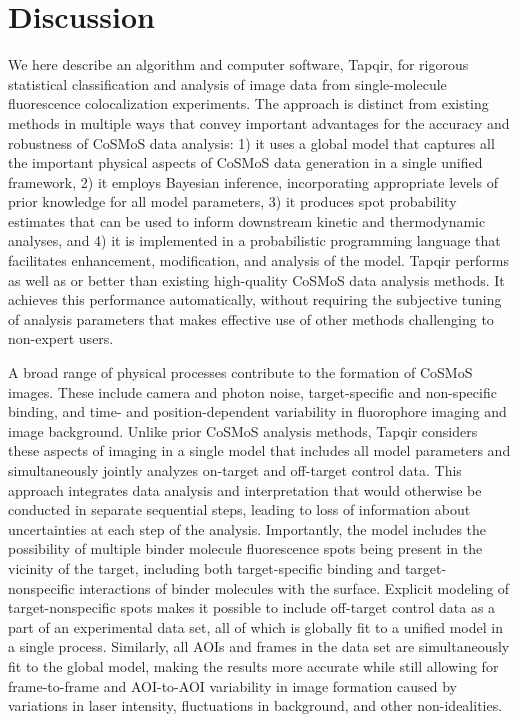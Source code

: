 \section*{Discussion}

We here describe an algorithm and computer software, Tapqir, for rigorous statistical classification and analysis of image data from single-molecule fluorescence colocalization experiments. The approach is distinct from existing methods in multiple ways that convey important advantages for the accuracy and robustness of CoSMoS data analysis: 1) it uses a global model that captures all the important physical aspects of CoSMoS data generation in a single unified framework, 2) it employs Bayesian inference, incorporating appropriate levels of prior knowledge for all model parameters, 3) it produces spot probability estimates that can be used to inform downstream kinetic and thermodynamic analyses, and 4) it is implemented in a probabilistic programming language that facilitates enhancement, modification, and analysis of the model. Tapqir performs as well as or better than  existing high-quality CoSMoS data analysis methods. It achieves this performance automatically, without requiring the subjective tuning of analysis parameters that makes effective use of other methods challenging to non-expert users.

A broad range of physical processes contribute to the formation of CoSMoS images. These include camera and photon noise, target-specific and non-specific binding, and time- and position-dependent variability in fluorophore imaging and image background. Unlike prior CoSMoS analysis methods, Tapqir considers these aspects of imaging in a single model that includes all model parameters and simultaneously jointly analyzes on-target and off-target control data.  This approach integrates data analysis and interpretation that would otherwise be conducted in separate sequential steps, leading to loss of information about uncertainties at each step of the analysis. Importantly, the model includes the possibility of multiple binder molecule fluorescence spots being present in the vicinity of the target, including both target-specific binding and target-nonspecific interactions of binder molecules with the surface. Explicit modeling of target-nonspecific spots makes it possible to include off-target control data as a part of an experimental data set, all of which is globally fit to a unified model in a single process.  Similarly, all AOIs and frames in the data set are simultaneously fit to the global model, making the results more accurate while still allowing for frame-to-frame and AOI-to-AOI variability in image formation caused by variations in laser intensity, fluctuations in background, and other non-idealities.

